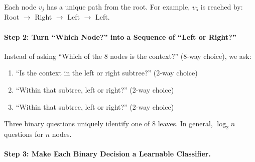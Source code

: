 \begin{notechapter}
\begin{center}
\end{center}

Each node $v_j$ has a unique path from the root. For example, $v_5$ is reached by: Root $\to$ Right $\to$ Left $\to$ Left.

\paragraph{Step 2: Turn ``Which Node?'' into a Sequence of ``Left or Right?''}

Instead of asking ``Which of the 8 nodes is the context?'' (8-way choice), we ask:
\begin{enumerate}
    \item ``Is the context in the left or right subtree?'' (2-way choice)
    \item ``Within that subtree, left or right?'' (2-way choice)
    \item ``Within that subtree, left or right?'' (2-way choice)
\end{enumerate}

Three binary questions uniquely identify one of 8 leaves. In general, $\log_2 n$ questions for $n$ nodes.

\paragraph{Step 3: Make Each Binary Decision a Learnable Classifier.}


\end{notechapter}

